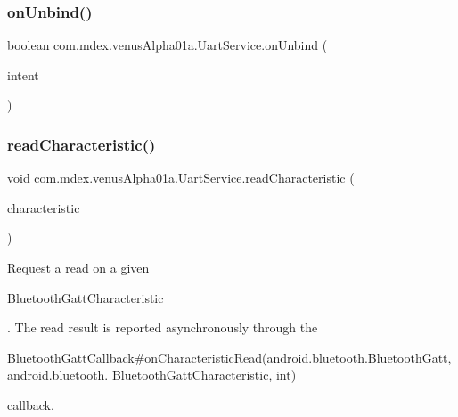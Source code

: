 \mbox{\label{classcom_1_1mdex_1_1venus_alpha01a_1_1_uart_service_a029ce1ef24fc3904b888bd217f4b115e}} 
\subsubsection{\texorpdfstring{on\+Unbind()}{onUnbind()}}
{\footnotesize\ttfamily boolean com.\+mdex.\+venus\+Alpha01a.\+Uart\+Service.\+on\+Unbind (\begin{DoxyParamCaption}\item[{Intent}]{intent }\end{DoxyParamCaption})}

\mbox{\label{classcom_1_1mdex_1_1venus_alpha01a_1_1_uart_service_ae686ffe62ae7f32165905349636ce676}} 
\subsubsection{\texorpdfstring{read\+Characteristic()}{readCharacteristic()}}
{\footnotesize\ttfamily void com.\+mdex.\+venus\+Alpha01a.\+Uart\+Service.\+read\+Characteristic (\begin{DoxyParamCaption}\item[{Bluetooth\+Gatt\+Characteristic}]{characteristic }\end{DoxyParamCaption})}

Request a read on a given
\begin{DoxyCode}
BluetoothGattCharacteristic 
\end{DoxyCode}
 . The read result is reported asynchronously through the
\begin{DoxyCode}
BluetoothGattCallback#onCharacteristicRead(android.bluetooth.BluetoothGatt, android.bluetooth.
      BluetoothGattCharacteristic, \textcolor{keywordtype}{int}) 
\end{DoxyCode}
 callback.


